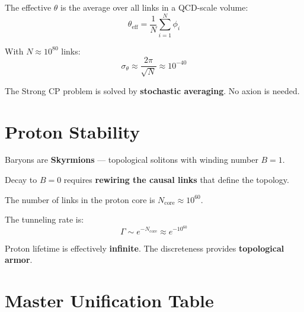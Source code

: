 \documentclass[11pt, a4paper, openany]{book}
\begin{document}
The effective $\theta$ is the average over all links in a QCD-scale volume:
\begin{equation}
\theta_{\text{eff}} = \frac{1}{N} \sum_{i=1}^N \phi_i
\end{equation}

With $N \approx 10^{80}$ links:
\begin{equation}
\sigma_\theta \approx \frac{2\pi}{\sqrt{N}} \approx 10^{-40}
\end{equation}

\begin{result}
The Strong CP problem is solved by \textbf{stochastic averaging}. No axion is needed.
\end{result}

\section{Proton Stability}

Baryons are \textbf{Skyrmions} --- topological solitons with winding number $B=1$.

Decay to $B=0$ requires \textbf{rewiring the causal links} that define the topology.

The number of links in the proton core is $N_{\text{core}} \approx 10^{60}$.

The tunneling rate is:
\begin{equation}
\Gamma \sim e^{-N_{\text{core}}} \approx e^{-10^{60}}
\end{equation}

\begin{result}
Proton lifetime is effectively \textbf{infinite}. The discreteness provides \textbf{topological armor}.
\end{result}

\section{Master Unification Table}
\end{document}
